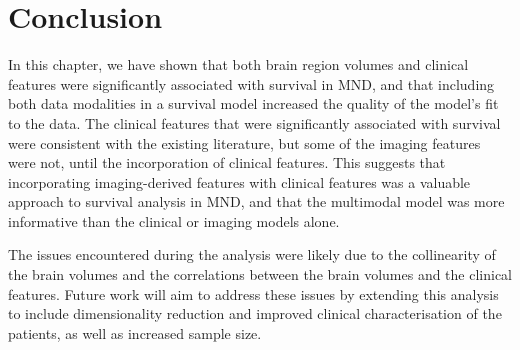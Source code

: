 \section{Conclusion}

In this chapter, we have shown that both brain region volumes and clinical features were significantly associated with survival in MND, and that including both data modalities in a survival model increased the quality of the model's fit to the data.
The clinical features that were significantly associated with survival were consistent with the existing literature, but some of the imaging features were not, until the incorporation of clinical features.
This suggests that incorporating imaging-derived features with clinical features was a valuable approach to survival analysis in MND, and that the multimodal model was more informative than the clinical or imaging models alone.

The issues encountered during the analysis were likely due to the collinearity of the brain volumes and the correlations between the brain volumes and the clinical features.
Future work will aim to address these issues by extending this analysis to include dimensionality reduction and improved clinical characterisation of the patients, as well as increased sample size.
